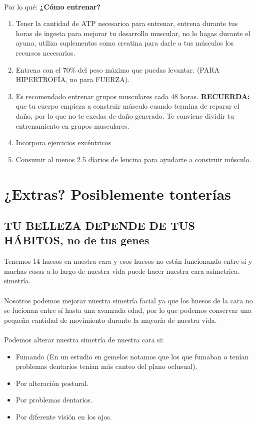\documentclass{article}
\begin{document}
\\
Por lo qué: \textbf{¿Cómo entrenar?} 
\begin{enumerate}
    \item Tener la cantidad de ATP necesarioa para entrenar, entrena durante tus horas de ingesta para mejorar tu desarrollo muscular, no lo hagas durante el ayuno, utiliza suplementos como creatina para darle a tus músculos los recursos necesarios.
    \item Entrena con el $70\%$ del peso máximo que puedas levantar. (PARA HIPERTROFÍA, no para FUERZA).
    \item Es recomendado entrenar grupos musculares cada 48 horas. \textbf{RECUERDA:} que tu cuerpo empieza a construir músculo cuando termina de reparar el daño, por lo que no te exedas de daño generado. Te conviene dividir tu entrenamiento en grupos musculares. 
    \item Incorpora ejercicios excéntricos  
    \item Consumir al menos 2.5 díarios de leucina para ayudarte a construir músculo. 
\end{enumerate}

\section{¿Extras? Posiblemente tonterías}
\subsection{TU BELLEZA DEPENDE DE TUS HÁBITOS, no de tus genes}
Tenemos 14 huesos en nuestra cara y esos huesos no están funcionando entre sí y muchas cosas a lo largo de nuestra vida puede hacer nuestra cara asímetrica.
simetría.\\
\\
Nosotros podemos mejorar nuestra simetría facial ya que los huesos de la cara no se fucionan entre sí hasta una avanzada edad, por lo que podemos conservar una pequeña cantidad de movimiento durante la mayoría de nuestra vida.\\
\\
Podemos alterar nuestra simetría de nuestra cara si: 
\begin{itemize}
    \item Fumando (En un estudio en gemelos notamos que los que fumaban o tenían problemas dentaríos tenían más canteo del plano oclusual).
    \item Por alteración postural.
    \item Por problemas dentarios.
    \item Por diferente visión en los ojos.
\end{itemize}
\end{document}
